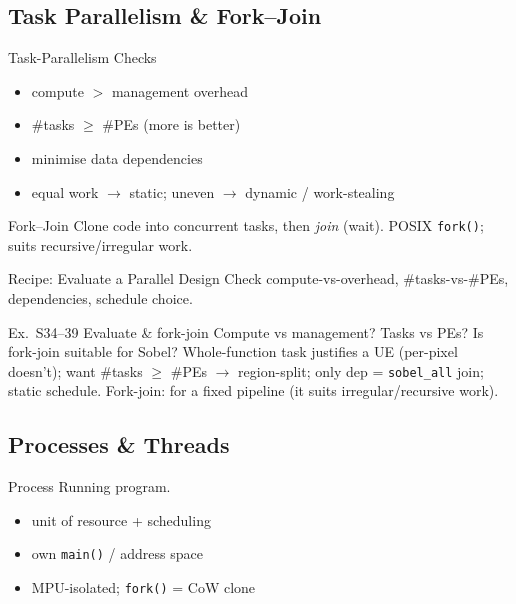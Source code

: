 \subsection{Task Parallelism \& Fork--Join}

\begin{concept}{Task-Parallelism Checks}
    \begin{itemize}
        \item compute $>$ management overhead
        \item \#tasks $\geq$ \#PEs (more is better)
        \item minimise data dependencies
        \item equal work $\to$ static; uneven $\to$ dynamic / work-stealing
    \end{itemize}
\end{concept}

\begin{definition}{Fork--Join}
    Clone code into concurrent tasks, then \emph{join} (wait).  POSIX \texttt{fork()}; suits recursive/irregular work.
\end{definition}

\begin{KR}{Recipe: Evaluate a Parallel Design}
    Check compute-vs-overhead, \#tasks-vs-\#PEs, dependencies, schedule choice.
\end{KR}

\begin{example2}{Ex.\ S34--39 Evaluate \& fork-join}
    Compute vs management? Tasks vs PEs? Is fork-join suitable for Sobel?
    \tcblower
    Whole-function task justifies a UE (per-pixel doesn't); want \#tasks $\geq$ \#PEs $\to$ region-split; only dep = \texttt{sobel\_all} join; static schedule. Fork-join:  for a fixed pipeline (it suits irregular/recursive work).
\end{example2}

\subsection{Processes \& Threads}


\begin{definition}{Process}
    Running program.
    \begin{itemize}
        \item unit of resource + scheduling
        \item own \texttt{main()} / address space
        \item MPU-isolated; \texttt{fork()} = CoW clone
    \end{itemize}
\end{definition}

